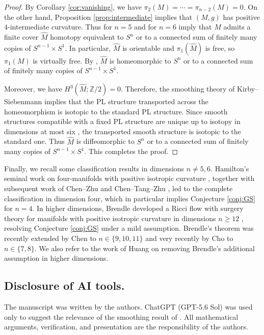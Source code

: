\documentclass[11pt]{amsart}
\theoremstyle{definition}
\begin{document}
\begin{proof}
       By Corollary \ref{cor:vanishing}, we have $\pi_2(M)=\cdots=\pi_{n-2}(M)=0$. On the other hand, Proposition \ref{prop:intermediate} implies that $(M,g)$ has positive $4$-intermediate curvature. Thus \cite[Theorem 1]{CLL2023} for $n=5$ and \cite[Theorem 7 (2)]{MWY2026} for $n=6$ imply that $M$ admits a finite cover $\hat M$ homotopy equivalent to $S^n$ or to a connected sum of finitely many copies of $S^{n-1}\times S^1$. In particular, $\hat{M}$ is orientable and $\pi_1(\hat{M})$ is free, so $\pi_1(M)$ is virtually free. By \cite[Theorem 1.3]{GS2009}, $\hat{M}$ is homeomorphic to $S^n$ or to a connected sum of finitely many copies of $S^{n-1}\times S^1$.
       
       Moreover, we have $H^3(\hat{M};\mathbb{Z}/2)=0$. Therefore, the smoothing theory of Kirby--Siebenmann \cite{KS1977} implies  that the PL structure transported across the homeomorphism is isotopic to the standard PL structure. Since smooth structures compatible with a fixed PL structure are unique up to isotopy in dimensions at most six \cite[Theorem~3.5(2)]{FNOP2025}, the transported smooth structure is isotopic to the standard one. Thus $\hat{M}$ is diffeomorphic to $S^n$ or to a connected sum of finitely many copies of $S^{n-1}\times S^1$. This completes the proof.
\end{proof}
Finally, we recall some classification results in dimensions \(n\neq5,6\). Hamilton's seminal work on four-manifolds with positive isotropic curvature \cite{Hamilton1997}, together with subsequent work of Chen--Zhu and Chen--Tang--Zhu \cite{ChenZhu2006,CTZ2012}, led to the complete classification in dimension four, which in particular implies Conjecture \ref{conj:GS} for $n=4$. In higher dimensions, Brendle developed a Ricci flow with surgery theory for manifolds with positive isotropic curvature in dimensions \(n\geq12\) \cite{Brendle2019}, resolving Conjecture \ref{conj:GS} under a mild assumption. Brendle's theorem was recently extended by Chen \cite{Chen2026} to \(n\in \{9,10,11\}\) and very recently by Cho \cite{Cho2026} to \(n\in\{7,8\}\). We also refer to the work of Huang \cite{Huang2025} on removing Brendle's additional assumption in higher dimensions.
\subsection*{Disclosure of AI tools.}
The manuscript was written by the authors. ChatGPT (GPT-5.6 Sol) was used only to suggest the relevance of the smoothing result of \cite{KS1977, FNOP2025, DP2026}. All mathematical arguments, verification, and presentation are the responsibility of the authors.
\end{document}
